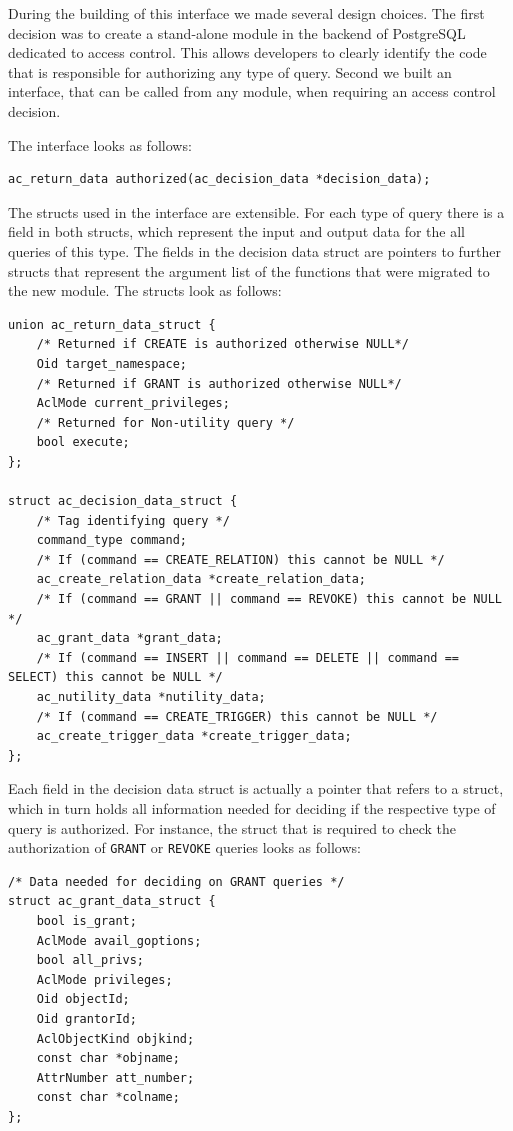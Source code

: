 During the building of this interface we made several design choices.
%
The first decision was to create a stand-alone module in the backend of PostgreSQL dedicated to access control.
This allows developers to clearly identify the code that is responsible for authorizing any type of query.
%
Second we built an interface, that can be called from any module, when requiring an access control decision.

The interface looks as follows:
%
\begin{lstlisting}[frame=single, style=customc]
ac_return_data authorized(ac_decision_data *decision_data);
\end{lstlisting}
%
The structs used in the interface are extensible. For each type of query there is a field in both structs, which represent the input and output data for the all queries of this type.
%
The fields in the decision data struct are pointers to further structs that represent the argument list of the functions that were migrated to the new module.
%
The structs look as follows: 
%
\begin{lstlisting}[frame=single, style=customc]
union ac_return_data_struct {
	/* Returned if CREATE is authorized otherwise NULL*/
	Oid target_namespace; 
	/* Returned if GRANT is authorized otherwise NULL*/
	AclMode current_privileges; 
	/* Returned for Non-utility query */
	bool execute; 
};

struct ac_decision_data_struct {
	/* Tag identifying query */
	command_type command;
	/* If (command == CREATE_RELATION) this cannot be NULL */
	ac_create_relation_data *create_relation_data; 
	/* If (command == GRANT || command == REVOKE) this cannot be NULL */
	ac_grant_data *grant_data; 
	/* If (command == INSERT || command == DELETE || command == SELECT) this cannot be NULL */
	ac_nutility_data *nutility_data; 
	/* If (command == CREATE_TRIGGER) this cannot be NULL */
	ac_create_trigger_data *create_trigger_data; 
};
\end{lstlisting}
%
Each field in the decision data struct is actually a pointer that refers to a struct, which in turn holds all information needed for deciding if the respective type of query is authorized.
%
For instance, the struct that is required to check the authorization of \texttt{GRANT} or \texttt{REVOKE} queries looks as follows:
%
\begin{lstlisting}[frame=single, style=customc]
/* Data needed for deciding on GRANT queries */
struct ac_grant_data_struct {
	bool is_grant;
	AclMode avail_goptions;
	bool all_privs;
	AclMode privileges;
	Oid objectId;
	Oid grantorId;
	AclObjectKind objkind;
	const char *objname;
	AttrNumber att_number;
	const char *colname;
};
\end{lstlisting}
